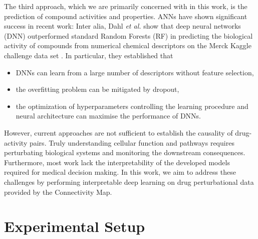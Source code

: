 \documentclass[bsc,frontabs,twoside,singlespacing,parskip,deptreport]{infthesis}     %
\begin{document}
The third approach, which we are primarily concerned with in this work, is the prediction of compound activities and properties. ANNs have shown significant success in recent work: Inter alia, Dahl \textit{et al.} show that deep neural networks (DNN) outperformed standard Random Forests (RF) in predicting the biological activity of compounds from numerical chemical descriptors on the Merck Kaggle challenge data set \cite{ma_deep_2015}. In particular, they established that
\begin{itemize}
    \item DNNs can learn from a large number of descriptors without feature selection,
    \item the overfitting problem can be mitigated by dropout,
    \item the optimization of hyperparameters controlling the learning procedure and neural architecture can maximise the performance of DNNs\cite{chen_rise_2018}.
\end{itemize}
However, current approaches are not sufficient to establish the causality of drug-activity pairs. Truly understanding cellular function and pathways requires perturbating biological systems and monitoring the downstream consequences. Furthermore, most work lack the interpretability of the developed models required for medical decision making. In this work, we aim to address these challenges by performing interpretable deep learning on drug perturbational data provided by the Connectivity Map.

\chapter{Experimental Setup}\label{methodology}
\end{document}

